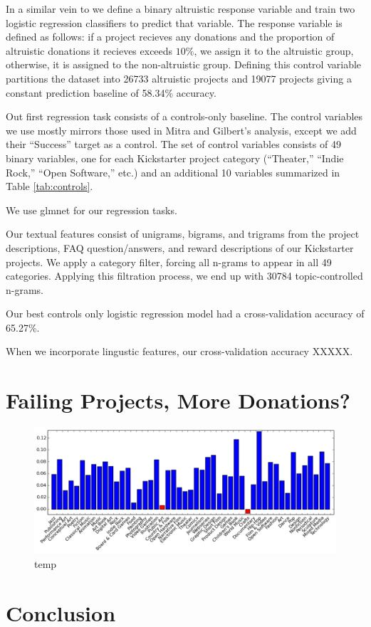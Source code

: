 \documentclass[letterpaper]{article}
\begin{document}
In a similar vein to \cite{mitra2014language} we define a binary altruistic response variable and train two logistic regression classifiers to predict that variable. The response variable is defined as follows: if a project recieves any donations and the proportion of altruistic donations it recieves exceeds $10\%$, we assign it to the altruistic group, otherwise, it is assigned to the non-altruistic group. Defining this control variable partitions the dataset into 26733 altruistic projects and 19077 projects giving a constant prediction baseline of 58.34\% accuracy.

Out first regression task consists of a controls-only baseline. The control variables we use mostly mirrors those used in Mitra and Gilbert's analysis, except we add their ``Success'' target as a control. The set of control variables consists of 49 binary variables, one for each Kickstarter project category (``Theater,'' ``Indie Rock,'' ``Open Software,'' etc.) and an additional 10 variables summarized in Table \ref{tab:controls}.

We use glmnet \cite{friedman2010glmnet} for our regression tasks. 

Our textual features consist of unigrams, bigrams, and trigrams from the project descriptions, FAQ question/answers, and reward descriptions of our Kickstarter projects. We apply a category filter, forcing all n-grams to appear in all 49 categories. Applying this filtration process, we end up with 30784 topic-controlled n-grams.

Our best controls only logistic regression model had a cross-validation accuracy of 65.27\%.

When we incorporate lingustic features, our cross-validation accuracy XXXXX.

\section{Failing Projects, More Donations?}

\begin{figure}
\centering
\includegraphics[width=.9\textwidth]{figures/failSuccess.png}                         
\caption{temp}
\label{fig:succfail}
\end{figure}

\section{Conclusion}

 
\end{document}
